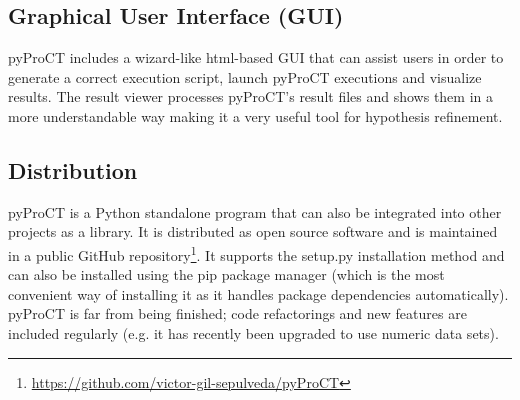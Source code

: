 \subsection{Graphical User Interface (GUI)}

pyProCT includes a wizard-like html-based GUI that can assist users in order to generate a correct execution script,
launch pyProCT executions and visualize results. The result viewer processes pyProCT's result files and shows them in a
more understandable way making it a very useful tool for hypothesis refinement. 

\subsection{Distribution}

pyProCT is a Python standalone program that can also be integrated into other projects as a library. It is distributed
as open source software and is maintained in a public GitHub
repository\footnote{\url{https://github.com/victor-gil-sepulveda/pyProCT}}. It supports the setup.py installation
method and can also be installed using the pip package manager (which is the most convenient way of installing it as it
handles package dependencies automatically). pyProCT is far from being finished; code refactorings and new features
are included regularly (e.g. it has recently been upgraded to use numeric data sets).

\newpage
